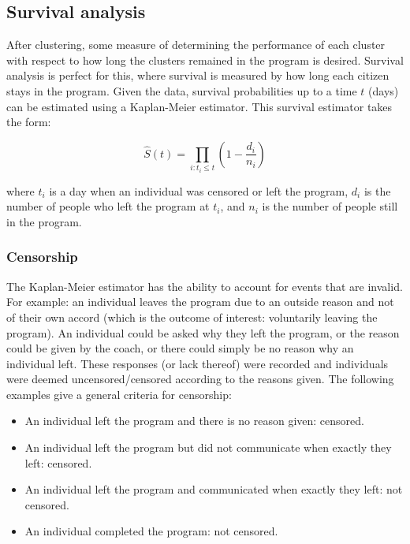 \documentclass[12pt]{article}
\begin{document}
\newpage

\subsection{Survival analysis}
	
	After clustering, some measure of determining the performance of each cluster with respect to how long the clusters remained in the program is desired. Survival analysis is perfect for this, where survival is measured by how long each citizen stays in the program. Given the data, survival probabilities up to a time $t$ (days) can be estimated using a Kaplan-Meier estimator. This survival estimator takes the form:
	
	$$
	\widehat{S}(t) = \prod_{i: t_i \leq t} \left( 1 - \frac{d_i}{n_i} \right)
	$$
	
	where $t_i$ is a day when an individual was censored or left the program, $d_i$ is the number of people who left the program at $t_i$, and $n_i$ is the number of people still in the program.
	
	
	
	\subsubsection{Censorship}
	
	The Kaplan-Meier estimator has the ability to account for events that are invalid. For example: an individual leaves the program due to an outside reason and not of their own accord (which is the outcome of interest: voluntarily leaving the program). An individual could be asked why they left the program, or the reason could be given by the coach, or there could simply be no reason why an individual left. These responses (or lack thereof) were recorded and individuals were deemed uncensored/censored according to the reasons given. The following examples give a general criteria for censorship:
	\begin{itemize}
		\item An individual left the program and there is no reason given: censored.
		\item An individual left the program but did not communicate when exactly they left: censored.
		\item An individual left the program and communicated when exactly they left: not censored.
		\item An individual completed the program: not censored.
	\end{itemize}
	
\end{document}
